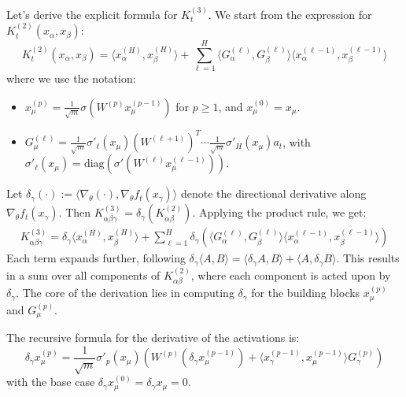 \documentclass[11pt,a4paper]{article}
\theoremstyle{definition}
\begin{document}
Let's derive the explicit formula for $K^{(3)}_t$. We start from the expression for $K^{(2)}_t(x_\alpha, x_\beta)$:
\begin{equation}
K^{(2)}_t(x_\alpha, x_\beta) = \langle x^{(H)}_\alpha, x^{(H)}_\beta \rangle + \sum_{\ell=1}^{H} \langle G^{(\ell)}_\alpha, G^{(\ell)}_\beta \rangle \langle x^{(\ell-1)}_\alpha, x^{(\ell-1)}_\beta \rangle
\end{equation}
where we use the notation:
\begin{itemize}
    \item $x^{(p)}_\mu = \frac{1}{\sqrt{m}}\sigma(W^{(p)} x^{(p-1)}_\mu)$ for $p \ge 1$, and $x^{(0)}_\mu = x_\mu$.
    \item $G^{(\ell)}_\mu = \frac{1}{\sqrt{m}}\sigma'_\ell(x_\mu) (W^{(\ell+1)})^T \cdots \frac{1}{\sqrt{m}}\sigma'_H(x_\mu) a_t$, with $\sigma'_\ell(x_\mu) = \text{diag}(\sigma'(W^{(\ell)}x^{(\ell-1)}_\mu))$.
\end{itemize}

Let $\delta_\gamma(\cdot) := \langle \nabla_\theta (\cdot), \nabla_\theta f_t(x_\gamma) \rangle$ denote the directional derivative along $\nabla_\theta f_t(x_\gamma)$. Then $K^{(3)}_{\alpha\beta\gamma} = \delta_\gamma(K^{(2)}_{\alpha\beta})$. Applying the product rule, we get:
\begin{align}
K^{(3)}_{\alpha\beta\gamma} = \delta_\gamma \langle x^{(H)}_\alpha, x^{(H)}_\beta \rangle + \sum_{\ell=1}^{H} \delta_\gamma \left( \langle G^{(\ell)}_\alpha, G^{(\ell)}_\beta \rangle \langle x^{(\ell-1)}_\alpha, x^{(\ell-1)}_\beta \rangle \right)
\end{align}
Each term expands further, following $\delta_\gamma \langle A, B \rangle = \langle \delta_\gamma A, B \rangle + \langle A, \delta_\gamma B \rangle$. This results in a sum over all components of $K^{(2)}_{\alpha\beta}$, where each component is acted upon by $\delta_\gamma$. The core of the derivation lies in computing $\delta_\gamma$ for the building blocks $x^{(p)}_\mu$ and $G^{(p)}_\mu$.

The recursive formula for the derivative of the activations is:
\begin{equation}
\delta_\gamma x^{(p)}_\mu = \frac{1}{\sqrt{m}} \sigma'_{p}(x_\mu) \left( W^{(p)} (\delta_\gamma x^{(p-1)}_\mu) + \langle x^{(p-1)}_\gamma, x^{(p-1)}_\mu \rangle G^{(p)}_\gamma \right)
\end{equation}
with the base case $\delta_\gamma x^{(0)}_\mu = \delta_\gamma x_\mu = 0$.
\end{document}
